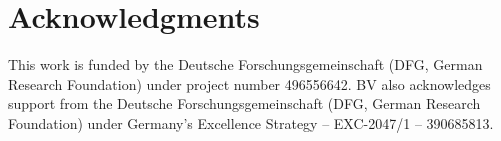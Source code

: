 \documentclass{article}
\begin{document}
\section*{Acknowledgments}
This work is funded by the Deutsche Forschungsgemeinschaft (DFG, German Research Foundation) under project number 496556642. BV also acknowledges support from the Deutsche Forschungsgemeinschaft (DFG, German Research Foundation) under Germany's Excellence Strategy – EXC-2047/1 – 390685813.

 

  
\end{document}
